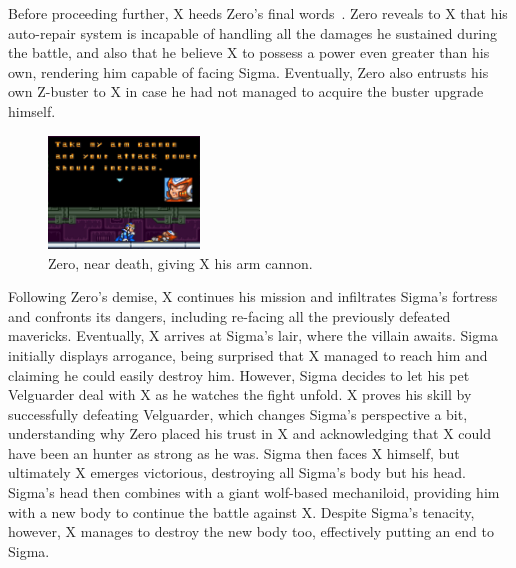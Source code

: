 Before proceeding further, X heeds Zero's final words~\cite{wiki:MMX_script}. Zero reveals to X that his auto-repair system is incapable of handling all the damages he sustained during the battle, and also that he believe X to possess a power even greater than his own, rendering him capable of facing Sigma. Eventually, Zero also entrusts his own Z-buster to X in case he had not managed to acquire the buster upgrade himself.

\begin{figure}[htp]
	\centering
	\includegraphics[height=3cm]{figures/X1/Zero_cannon.jpg}
	\caption{Zero, near death, giving X his arm cannon.}
\end{figure}

Following Zero's demise, X continues his mission and infiltrates Sigma's fortress and confronts its dangers, including re-facing all the previously defeated mavericks. Eventually, X arrives at Sigma's lair, where the villain awaits. Sigma initially displays arrogance, being surprised that X managed to reach him and claiming he could easily destroy him. However, Sigma decides to let his pet Velguarder deal with X as he watches the fight unfold. X proves his skill by successfully defeating Velguarder, which changes Sigma's perspective a bit, understanding why Zero placed his trust in X and acknowledging that X could have been an hunter as strong as he was. Sigma then faces X himself, but ultimately X emerges victorious, destroying all Sigma's body but his head. Sigma's head then combines with a giant wolf-based mechaniloid, providing him with a new body to continue the battle against X. Despite Sigma's tenacity, however, X manages to destroy the new body too, effectively putting an end to Sigma. 

